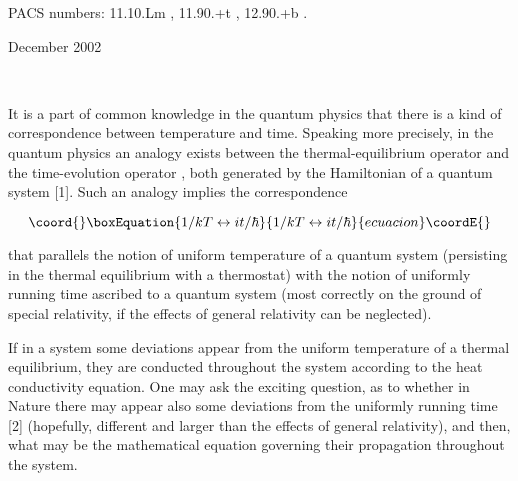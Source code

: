 \documentclass[a4paper,12pt]{article}
\begin{document}
\vspace{0.2cm}

\ni PACS numbers: 11.10.Lm , 11.90.+t , 12.90.+b .

\vspace{0.6cm}

\ni December 2002

\vfill\eject

~~~
\pagestyle {plain}

\setcounter{page}{1}



\vspace{0.2cm}

It is a part of common knowledge in the quantum physics that there is a kind of correspondence between temperature and time. Speaking more precisely, in the quantum physics an analogy exists between the thermal-equilibrium operator \coordHE{} and the time-evolution operator \coordHE{}, both generated by the Hamiltonian \coordHE{} of a quantum system [1]. Such an analogy implies the correspondence

\vspace{-0.2cm}

\begin{equation}\coord{}\boxEquation{
1/kT \leftrightarrow it/\hbar
}{
1/kT \leftrightarrow it/\hbar
}{ecuacion}\coordE{}\end{equation}

\ni that parallels the notion of uniform temperature \coordHE{} of a quantum system (persisting in the thermal equilibrium with a thermostat) with the notion of uniformly running time \coordHE{} ascribed to a quantum system (most correctly on the ground of special relativity, if the effects of general relativity can be neglected).

If in a system some deviations \coordHE{} appear from the uniform temperature \coordHE{} of a thermal equilibrium, they are conducted throughout the system according to the heat conductivity equation. One may ask the exciting question, as to whether in Nature there may appear also some deviations \coordHE{} from the uniformly running time \coordHE{} [2] (hopefully, different and larger than the effects of general relativity), and then, what may be the mathematical equation governing their propagation throughout the system.
\end{document}
